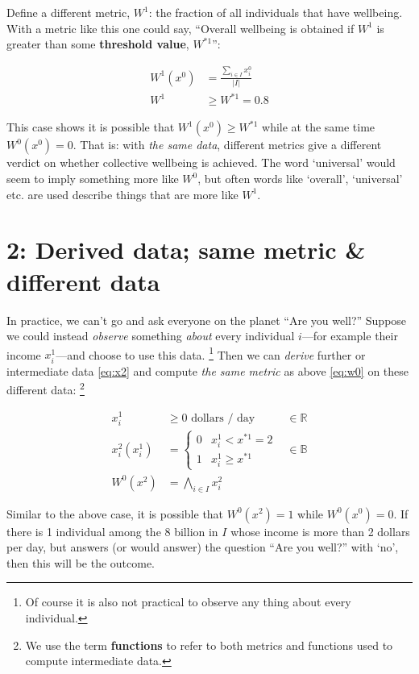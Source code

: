 \documentclass[a5paper,11pt]{article}
\begin{document}
Define a different metric, $W^1$: the fraction of all individuals that have wellbeing.
With a metric like this one could say, “Overall wellbeing is obtained if $W^1$ is greater than some \textbf{threshold value}, $W^{\ast 1}$”:

\begin{align}
  W^1(x^0) & = \frac{\sum_{i \in I}{x^0_i}}{|I|} \\
  W^1 & \geq W^{\ast 1} = 0.8
\end{align}

This case shows it is possible that $W^1(x^0) \geq W^{\ast 1}$ while at the same time $W^0(x^0) = 0$.
That is: with \emph{the same data}, different metrics give a different verdict on whether collective wellbeing is achieved.
The word ‘universal’ would seem to imply something more like $W^0$, but often words like ‘overall’, ‘universal’ etc. are used describe things that are more like $W^1$.

\section{2: Derived data; same metric \& different data}

In practice, we can't go and ask everyone on the planet “Are you well?”
Suppose we could instead \emph{observe} something \emph{about} every individual $i$—for example their income $x^1_i$—and choose to use this data.%
\footnote{Of course it is also not practical to observe any thing about every individual.}
Then we can \emph{derive} further or intermediate data \eqref{eq:x2} and compute \emph{the same metric} as above \eqref{eq:w0} on these different data:%
\footnote{We use the term \textbf{functions} to refer to both metrics and functions used to compute intermediate data.}

\begin{align}
  x^1_{i}         & \geq 0 \text{ dollars / day} & \in \mathbb{R} \\
  x^2_{i}(x^1_i)  & = \begin{cases}
                        0 & x^1_i < x^{\ast 1} = 2 \\
                        1 & x^1_i \geq x^{\ast 1}
                      \end{cases}
                  & \in \mathbb{B} \label{eq:x2} \\
  W^0(x^2)        & = \bigwedge_{i \in I}{x^2_i}
\end{align}

Similar to the above case, it is possible that $W^0(x^2) = 1$ while $W^0(x^0) = 0$.
If there is 1 individual among the 8 billion in $I$ whose income is more than 2 dollars per day, but answers (or would answer) the question “Are you well?” with ‘no’, then this will be the outcome.
\end{document}
